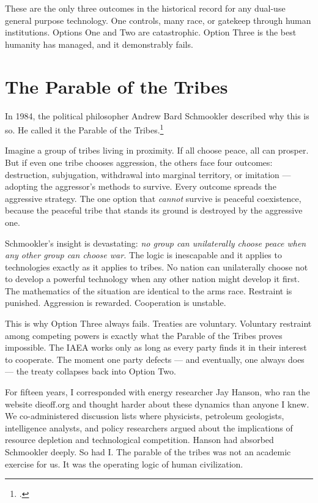 These are the only three outcomes in the historical record for any dual-use general purpose technology. One controls, many race, or gatekeep through human institutions. Options One and Two are catastrophic. Option Three is the best humanity has managed, and it demonstrably fails.

\section*{The Parable of the Tribes}
\label{pos08:the-parable-of-the-tribes}

In 1984, the political philosopher Andrew Bard Schmookler described why this is so. He called it the Parable of the Tribes.\footcite{schmookler1984}

Imagine a group of tribes living in proximity. If all choose peace, all can prosper. But if even one tribe chooses aggression, the others face four outcomes: destruction, subjugation, withdrawal into marginal territory, or imitation --- adopting the aggressor's methods to survive. Every outcome spreads the aggressive strategy. The one option that \textit{cannot} survive is peaceful coexistence, because the peaceful tribe that stands its ground is destroyed by the aggressive one.

Schmookler's insight is devastating: \textit{no group can unilaterally choose peace when any other group can choose war.} The logic is inescapable and it applies to technologies exactly as it applies to tribes. No nation can unilaterally choose not to develop a powerful technology when any other nation might develop it first. The mathematics of the situation are identical to the arms race. Restraint is punished. Aggression is rewarded. Cooperation is unstable.

This is why Option Three always fails. Treaties are voluntary. Voluntary restraint among competing powers is exactly what the Parable of the Tribes proves impossible. The IAEA works only as long as every party finds it in their interest to cooperate. The moment one party defects --- and eventually, one always does --- the treaty collapses back into Option Two.

For fifteen years, I corresponded with energy researcher Jay Hanson, who ran the website dieoff.org and thought harder about these dynamics than anyone I knew. We co-administered discussion lists where physicists, petroleum geologists, intelligence analysts, and policy researchers argued about the implications of resource depletion and technological competition. Hanson had absorbed Schmookler deeply. So had I. The parable of the tribes was not an academic exercise for us. It was the operating logic of human civilization.

